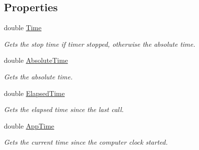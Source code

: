 \subsection*{Properties}
\begin{DoxyCompactItemize}
\item 
double \hyperlink{class_microsoft_1_1_samples_1_1_kinect_1_1_avateering_1_1_filters_1_1_timer_a9b9f45503cee32ccde7f8e6c9266775f}{Time}
\begin{DoxyCompactList}\small\item\em Gets the stop time if timer stopped, otherwise the absolute time. \end{DoxyCompactList}\item 
double \hyperlink{class_microsoft_1_1_samples_1_1_kinect_1_1_avateering_1_1_filters_1_1_timer_adec0c50e5672b30b1ff76376e8afd3c8}{Absolute\+Time}
\begin{DoxyCompactList}\small\item\em Gets the absolute time. \end{DoxyCompactList}\item 
double \hyperlink{class_microsoft_1_1_samples_1_1_kinect_1_1_avateering_1_1_filters_1_1_timer_a00024192f2aa0880fbd93bd2340d4c31}{Elapsed\+Time}
\begin{DoxyCompactList}\small\item\em Gets the elapsed time since the last call. \end{DoxyCompactList}\item 
double \hyperlink{class_microsoft_1_1_samples_1_1_kinect_1_1_avateering_1_1_filters_1_1_timer_a91863829bd1c44609689762d27fef591}{App\+Time}
\begin{DoxyCompactList}\small\item\em Gets the current time since the computer clock started. \end{DoxyCompactList}\end{DoxyCompactItemize}


